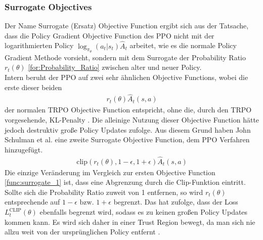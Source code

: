 \subsubsection{Surrogate Objectives}
Der Name Surrogate (Ersatz) Objective Function ergibt sich aus der Tatsache, dass die Policy Gradient Objective Function des PPO nicht mit der logarithmierten Policy $\log_{\pi_{\theta}}(a_{t}|s_{t})\hat{A}_{t}$ arbeitet, wie es die normale Policy Gradient Methode vorsieht, sondern mit dem Surrogate der Probability Ratio $r_{t}(\theta)$ \ref{for:Probability_Ratio} zwischen alter und neuer Policy.\\
Intern beruht der PPO auf zwei sehr ähnlichen Objective Functions, wobei die erste dieser beiden
\begin{align}
	\label{func:surrogate_1}
	r_{t}(\theta) \hat{A}_{t}(s, a)
\end{align}
der normalen TRPO Objective Function entspricht, ohne die, durch den TRPO vorgesehende, KL-Penalty \cite{TRPO, PPO}. 
Die alleinige Nutzung dieser Objective Function hätte jedoch destruktiv große Policy Updates zufolge. Aus diesem Grund haben John Schulman et al. eine zweite Surrogate Objective Function, dem PPO Verfahren hinzugefügt. 
\begin{align}
	\text{clip}(r_{t}(\theta), 1 - \epsilon, 1 + \epsilon) \hat{A}_{t}(s, a)
\end{align}
Die einzige Veränderung im Vergleich zur ersten Objective Function \ref{func:surrogate_1} ist, dass eine Abgrenzung durch die Clip-Funktion eintritt. Sollte sich die Probability Ratio zuweit von 1 entfernen, so wird $r_{t}(\theta)$ entsprechende auf $1 - \epsilon \text{ bzw. } 1 + \epsilon$ begrenzt. Das hat zufolge, dass der Loss $L^{\text{CLIP}}_{t}(\theta)$ ebenfalls begrenzt wird, sodass es zu keinen großen Policy Updates kommen kann. Es wird sich daher in einer Trust Region bewegt, da man sich nie allzu weit von der ursprünglichen Policy entfernt \cite{TRPO, PPO}.

